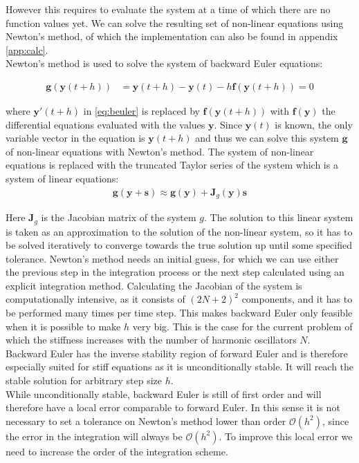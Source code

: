 \documentclass{article}
\begin{document}
However this requires to evaluate the system at a time of which there are no function values yet. We can solve the resulting set of non-linear equations using Newton's method, of which the implementation can also be found in appendix \ref{app:calc}. \\ 
Newton's method is used to solve the system of backward Euler equations:

\begin{align}
\mathbf{g}(\mathbf{y}(t+h))  
 &= \mathbf{y}(t + h) - \mathbf{y}(t) - h \mathbf{f}(\mathbf{y}(t + h)) = 0
\end{align}

where $\mathbf{y}'(t+h)$ in \eqref{eq:beuler} is replaced by $\mathbf{f}(\mathbf{y}(t + h))$ with $\mathbf{f(y)}$ the differential equations evaluated with the values $\mathbf{y}$. Since $\mathbf{y}(t)$ is known, the only variable vector in the equation is $\mathbf{y}(t+h)$ and thus we can solve this system $\mathbf{g}$ of non-linear equations with Newton's method. The system of non-linear equations is replaced with the truncated Taylor series of the system which is a system of linear equations:
\begin{align}
\mathbf{g}(\mathbf{y} + \mathbf{s}) \approx \mathbf{g}(\mathbf{y}) + \mathbf{J}_g (\mathbf{y})\mathbf{s}
\end{align}

Here $\mathbf{J}_g$ is the Jacobian matrix of the system $g$. The solution to this linear system is taken as an approximation to the solution of the non-linear system, so it has to be solved iteratively to converge towards the true solution up until some specified tolerance.
Newton's method needs an initial guess, for which we can use either the previous step in the integration process or the next step calculated using an explicit integration method.
Calculating the Jacobian of the system is computationally intensive, as it consists of $(2N + 2)^2$ components, and it has to be performed many times per time step. 
This makes backward Euler only feasible when it is possible to make $h$ very big. This is the case for the current problem of which the stiffness increases with the number of harmonic oscillators $N$. 
Backward Euler has the inverse stability region of forward Euler and is therefore especially suited for stiff equations as it is unconditionally stable. It will reach the stable solution for arbitrary step size $h$.  \\
While unconditionally stable, backward Euler is still of first order and will therefore have a local error comparable to forward Euler. In this sense it is not necessary to set a tolerance on Newton's method lower than order $\mathcal{O}(h^2)$, since the error in the integration will always be $\mathcal{O}(h^2)$. To improve this local error we need to increase the order of the integration scheme.
\end{document}
